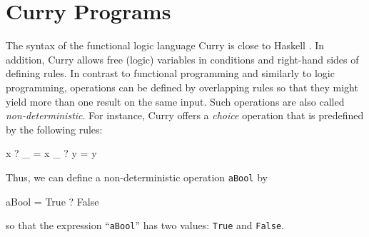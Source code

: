 \documentclass{llncs}
\newcommand{\code}[1]{\mbox{\small\texttt{#1}}}
\newcommand{\ccode}[1]{``\code{#1}''}
\begin{document}
\section{Curry Programs}
\label{sec:Curry}

The syntax of the functional logic language Curry \cite{Hanus06Curry}
is close to Haskell \cite{PeytonJones03Haskell}.
In addition, Curry allows free (logic)
variables in conditions and right-hand sides of defining rules.
In contrast to functional programming and similarly to logic programming,
operations can be defined by overlapping rules so that
they might yield more than one result on the same input.
Such operations are also called \emph{non-deterministic}.
For instance, Curry offers a \emph{choice} operation that is predefined by
the following rules:
%
\begin{curry}
  x ? _ = x
  _ ? y = y
\end{curry}
%
Thus, we can define a non-deterministic operation \code{aBool} by
\label{ex:aBool}
%
\begin{curry}
  aBool = True ? False
\end{curry}
%
so that the expression \ccode{aBool} has two values:
\code{True} and \code{False}.
\end{document}

